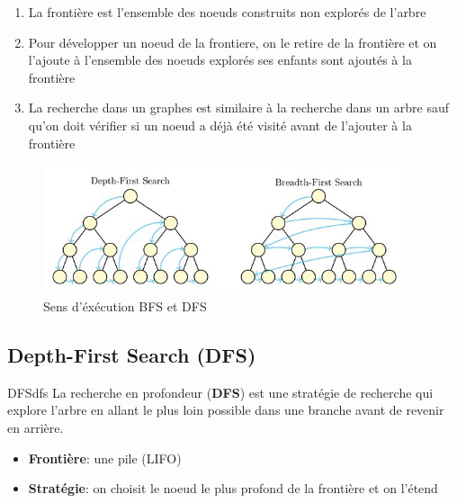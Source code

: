 \begin{remarks}\leavevmode
\begin{enumerate}
    \item La frontière est l'ensemble des noeuds construits non explorés de l'arbre
    \item Pour développer un noeud de la frontiere, on le retire de la frontière et on l'ajoute à l'ensemble des noeuds explorés
        ses enfants sont ajoutés à la frontière
    \item La recherche dans un graphes est similaire à la recherche dans un arbre sauf qu'on doit vérifier si un noeud a déjà été visité
        avant de l'ajouter à la frontière
\end{enumerate}
\end{remarks}



\begin{figure}[H]
    \begin{center}
        \includegraphics[width=0.95\textwidth]{pictures/bfsschema.jpg}
    \end{center}
    \caption{Sens d'éxécution BFS et DFS}\label{fig:bfsschema}
\end{figure}



\subsection{Depth-First Search (DFS)} %
\label{sub:dfs}

\begin{definition}{DFS}{dfs}
    La recherche en profondeur (\textbf{DFS}) est une stratégie de recherche qui explore l'arbre en allant le plus loin possible dans une branche avant de revenir en arrière. 
    \begin{itemize}
        \item \textbf{Frontière}: une pile (LIFO)
        \item \textbf{Stratégie}: on choisit le noeud le plus profond de la frontière et on l'étend
    \end{itemize} 
\end{definition}

